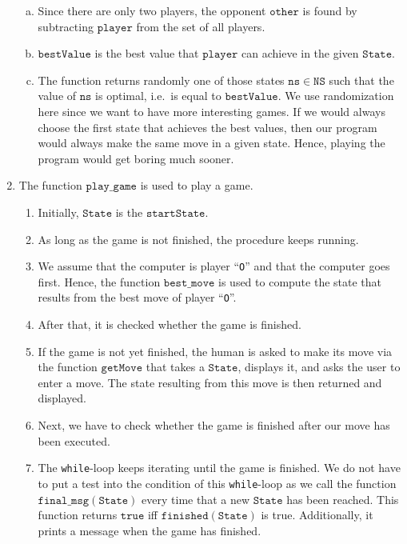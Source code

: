 \begin{enumerate}
\begin{enumerate}[(a)]
      \item Since there are only two players, the opponent $\mathtt{other}$ is found by subtracting
            $\mathtt{player}$ from the set of all players.
      \item $\mathtt{bestValue}$ is the best value that $\mathtt{player}$ can achieve in the given $\mathtt{State}$.
      \item The function returns randomly one of those states $\mathtt{ns} \in \mathtt{NS}$ such that 
            the value of $\mathtt{ns}$ is optimal, i.e.~is equal to $\mathtt{bestValue}$.
            We use randomization here since we want to have more interesting games.  If we would always choose
            the first state that achieves the best values, then our program would always make the same move in
            a given state.  Hence, playing the program would get boring much sooner.
      \end{enumerate}
\item The function $\mathtt{play\_game}$ is used to play a game.
      \begin{enumerate}
      \item Initially, $\mathtt{State}$ is the $\mathtt{startState}$.
      \item As long as the game is not finished, the procedure keeps running.
      \item We assume that the computer is player ``\texttt{O}'' and that the computer goes first.
            Hence, the function $\mathtt{best\_move}$ is used to compute the state that results from the best
            move of player ``\texttt{O}''.
      \item After that, it is checked whether the game is finished.
      \item If the game is not  yet finished, the human is asked to make its move via the function
            $\mathtt{getMove}$ that takes a $\mathtt{State}$, displays it, and asks the user to enter a move.
            The state resulting from this move is then returned and displayed.
      \item Next, we have to check whether the game is finished after our move has been executed.
      \item The \texttt{while}-loop keeps iterating until the game is finished.
            We do not have to put a test into the condition of this \texttt{while}-loop as we call the function
            $\mathtt{final\_msg}(\mathtt{State})$ every time that a new $\mathtt{State}$ has been reached.
            This function returns $\mathtt{true}$ iff $\mathtt{finished}(\mathtt{State})$ is true.
            Additionally, it prints a message when the game has finished.
      \end{enumerate}
\end{enumerate}

